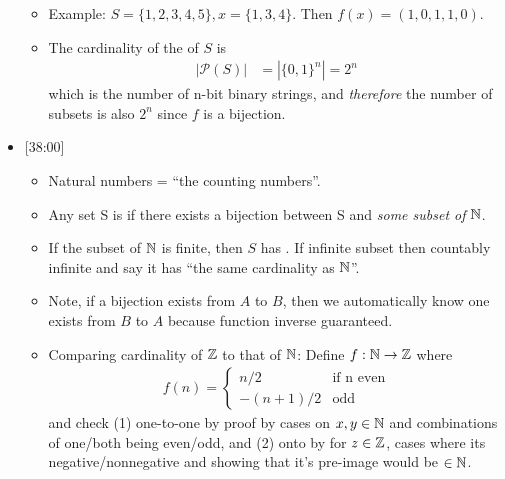 \documentclass[12pt]{article}
\begin{document}
\begin{itemize}
\begin{itemize}
		\item Example: $S = \{1, 2, 3, 4, 5\}, x = \{1, 3, 4\}$. Then $f(x) = (1, 0, 1, 1, 0)$. 
		
		\item The cardinality of the  of $S$ is 
		\begin{align}
			|\mathcal{P}(S)| &= |\{0, 1\}^n| = 2^n 
		\end{align}
		which is the number of n-bit binary strings, and \textit{therefore} the number of subsets is also $2^n$ since $f$ is a bijection. 
	\end{itemize}
	
	\item {} [38:00]
	\begin{itemize}
		\item Natural numbers = ``the counting numbers''. 
		\item Any set S is  if there exists a bijection between S and \textit{some subset of} $\mathbb{N}$. 
		\item If the subset of $\mathbb{N}$ is finite, then $S$ has . If infinite subset then countably infinite and say it has ``the same cardinality as $\mathbb{N}$''. 
		\item Note, if a bijection exists from $A$ to $B$, then we automatically know one exists from $B$ to $A$ because function inverse guaranteed. 
		\item Comparing cardinality of $\mathbb{Z}$ to that of $\mathbb{N}$: Define $f:\mathbb{N}\rightarrow\mathbb{Z}$ where
		\begin{align}
			f(n) = \begin{cases}
				n/2 & \text{if n even} \\
				-(n+1)/2 & \text{odd} 
			\end{cases}
		\end{align}
		and check (1) one-to-one by proof by cases on $x, y \in \mathbb{N}$ and combinations of one/both being even/odd, and (2) onto by for $z \in \mathbb{Z}$, cases where its negative/nonnegative and showing that it's pre-image would be $\in \mathbb{N}$. 
	\end{itemize}
\end{itemize}
\end{document}
